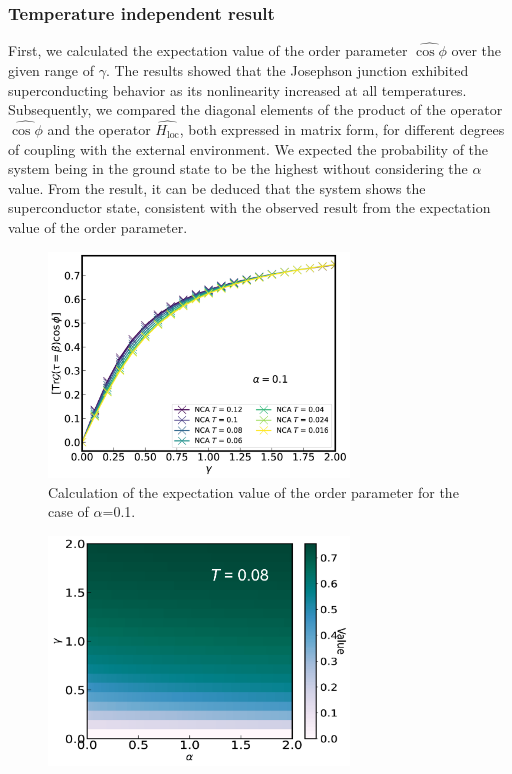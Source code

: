 \documentclass{article}[12pt]
\begin{document}
\begin{spacing}{1.3}
\subsubsection*{Temperature independent result}
First, we calculated the expectation value of the order parameter $\hat{\cos\phi}$ 
over the given range of $\gamma$. The results showed that the Josephson junction exhibited superconducting behavior 
as its nonlinearity increased at all temperatures. Subsequently, we compared the diagonal elements of the product 
of the operator $\hat{\cos\phi}$ and the operator $\hat{H_{\text{loc}}}$, both expressed in matrix form, 
for different degrees of coupling with the external environment. We expected the probability of the system 
being in the ground state to be the highest without considering the $\alpha$ value. From the result, 
it can be deduced that the system shows the superconductor state, consistent with the observed
result from the expectation value of the order parameter.
\pagebreak
\begin{figure}[H]
  \vfill
  \centerline{\includegraphics[width=8cm]{TexFigure/4/4_3_01_Expec_alp_0.1.png}}
  \caption{Calculation of the expectation value of the order parameter for the case of $\alpha$=0.1.}
  \label{fig:Order1}
  \vfill
\end{figure}
\begin{figure}[H]
  \vfill
  \centerline{\includegraphics[width=8cm]{TexFigure/4/4_3_02_Temp.png}}

\end{figure}
\end{spacing}
\end{document}
